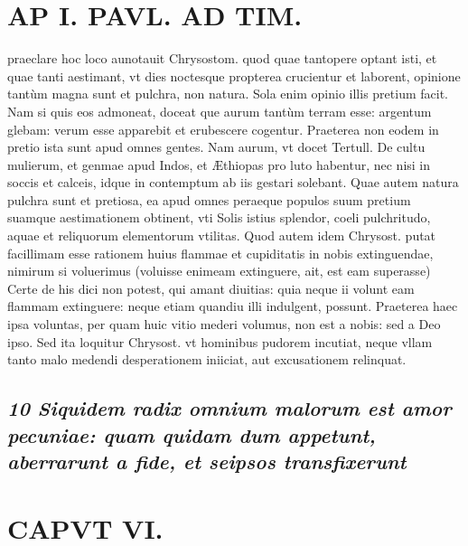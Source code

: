 \documentclass{article}
\begin{document}
\begin{pages}
\section*{AP I. PAVL. AD TIM. }
\marginpar{[ p.452 ]}\pstart praeclare hoc loco aunotauit Chrysostom. quod quae tantopere optant isti, et quae tanti aestimant, vt dies noctesque propterea crucientur et laborent, opinione tantùm magna sunt et pulchra, non natura. Sola enim opinio illis pretium facit. Nam si quis eos admoneat, doceat que aurum tantùm terram esse: argentum glebam: verum esse apparebit et erubescere cogentur. Praeterea non eodem in pretio ista sunt apud omnes gentes. Nam aurum, vt docet Tertull. De cultu mulierum, et genmae apud Indos, et Æthiopas pro luto habentur, nec nisi in soccis et calceis, idque in contemptum ab iis gestari solebant. Quae autem natura pulchra sunt et pretiosa, ea apud omnes peraeque populos suum pretium suamque aestimationem obtinent, vti Solis istius splendor, coeli pulchritudo, aquae et reliquorum elementorum vtilitas.  \pend\pstart Quod autem idem Chrysost. putat facillimam esse rationem huius flammae et cupiditatis in nobis extinguendae, nimirum si voluerimus (voluisse enimeam extinguere, ait, est eam superasse) Certe de his dici non potest, qui amant diuitias: quia neque ii volunt eam flammam extinguere: neque etiam quandiu illi indulgent, possunt. Praeterea haec ipsa voluntas, per quam huic vitio mederi volumus, non est a nobis: sed a Deo ipso. Sed ita loquitur Chrysost. vt hominibus pudorem incutiat, neque vllam tanto malo medendi desperationem iniiciat, aut excusationem relinquat.  \pend
{}
{}
\subsection*{\textit{10 Siquidem radix omnium malorum est amor pecuniae: quam quidam dum appetunt, aberrarunt a fide, et seipsos transfixerunt }}
\section*{CAPVT  VI. }
\marginpar{[ p.453 ]}
{}

\end{pages}
\end{document}
